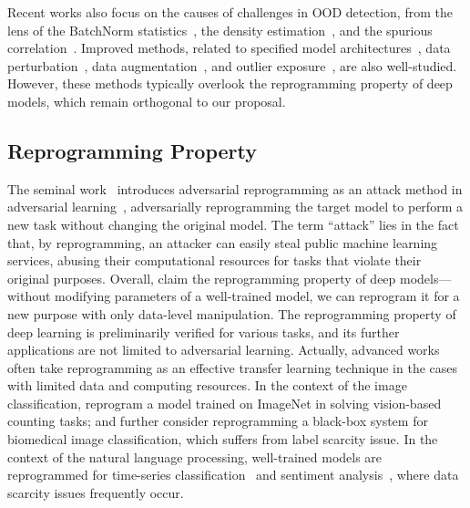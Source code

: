\documentclass{article}
\begin{document}
Recent works also focus on the causes of challenges in OOD detection, from the lens of the BatchNorm statistics~\cite{sun2021react}, the density estimation~\cite{morteza2021provable}, and the spurious correlation~\cite{sastry2019detecting}. Improved methods, related to specified model architectures~\cite{devries2018learning,wang2021energy}, data perturbation~\cite{BitterwolfM020,ChoiC20,LiangLS18}, data augmentation~\cite{0001AB19,HendrycksMCZGL20,ThulasidasanCBB19}, and outlier exposure~\cite{HendrycksMD19,huang2022harnessing}, are also well-studied. However, these methods typically overlook the reprogramming property of deep models, which remain orthogonal to our proposal. 







\subsection{Reprogramming Property}

The seminal work~\cite{elsayed2018adversarial} introduces adversarial reprogramming as an attack method in adversarial learning~\cite{GoodfellowSS14}, adversarially reprogramming the target model to perform a new task without changing the original model. The term ``attack'' lies in the fact that, by reprogramming, an attacker can easily steal public machine learning services, abusing their computational resources for tasks that violate their original purposes. Overall, \cite{elsayed2018adversarial} claim the reprogramming property of deep models---without modifying parameters of a well-trained model, we can reprogram it for a new purpose with only data-level manipulation. The reprogramming property of deep learning is preliminarily verified for various tasks, and its further applications are not limited to adversarial learning. Actually, advanced works often take reprogramming as an effective transfer learning technique in the cases with limited data and computing resources. In the context of the image classification, \cite{elsayed2018adversarial} reprogram a model trained on ImageNet in solving vision-based counting tasks; and \cite{TsaiCH20} further consider reprogramming a black-box system for biomedical image classification, which suffers from label scarcity issue. In the context of the natural language processing, well-trained models are reprogrammed for time-series classification~\cite{YangTC21} and sentiment analysis~\cite{hambardzumyan2021warp}, where data scarcity issues frequently occur. 
\end{document}
